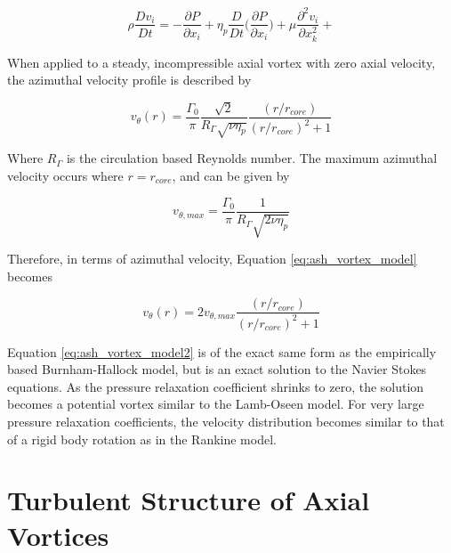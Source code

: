 \begin{equation}
\rho \frac{Dv_i}{Dt} = -\frac{\partial P}{\partial x_i} +
\eta_p \frac{D}{Dt} \Bigg( \frac{\partial P}{\partial x_i} \Bigg) + 
\mu \frac{\partial^2 v_i}{\partial x_{k}^2} + 
\label{eq:modified_ns4}
\end{equation}

When applied to a steady, incompressible axial vortex with zero axial velocity, 
the azimuthal velocity profile is described by

\begin{equation}
v_\theta(r) = \frac{\Gamma_0}{\pi} \frac{\sqrt{2}}{R_\Gamma \sqrt{\nu \eta_p}}
\frac{(r / r_{core})}{(r/r_{core})^2 + 1}
\label{eq:ash_vortex_model}
\end{equation}

\noindent
Where $R_\Gamma$ is the circulation based Reynolds number. The maximum 
azimuthal velocity occurs where $r = r_{core}$, and can be given by 

\begin{equation}
v_{\theta, max} = \frac{\Gamma_0}{\pi} \frac{1}{R_\Gamma \sqrt{2 \nu 
\eta_p}}
\label{eq:ash_vthetamax}
\end{equation}

\noindent
Therefore, in terms of azimuthal velocity, Equation \ref{eq:ash_vortex_model} 
becomes

\begin{equation}
v_\theta(r) = 2 v_{\theta, max}\frac{(r / r_{core})}{(r/r_{core})^2 + 1}
\label{eq:ash_vortex_model2}
\end{equation}

Equation \ref{eq:ash_vortex_model2} is of the exact same form as the 
empirically based Burnham-Hallock model, but is an exact solution to the Navier 
Stokes equations. As the pressure relaxation coefficient shrinks to zero, the 
solution becomes a potential vortex similar to the Lamb-Oseen model. For very 
large pressure relaxation coefficients, the velocity distribution becomes 
similar to that of a rigid body rotation as in the Rankine model. 


\section{Turbulent Structure of Axial Vortices}

